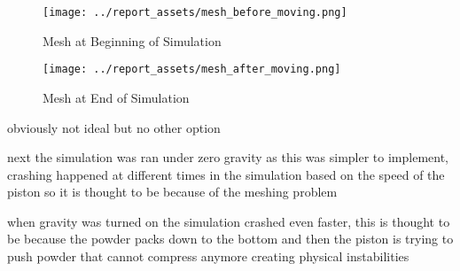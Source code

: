 \begin{figure}[htbp]
    \centering

    \begin{minipage}{0.45\textwidth}
        \centering
        \texttt{[image: ../report\_assets/mesh\_before\_moving.png]}
        \caption{Mesh at Beginning of Simulation}\label{fig:beginning-mesh}
    \end{minipage}
    \hfill
    \begin{minipage}{0.45\textwidth}
        \centering
        \texttt{[image: ../report\_assets/mesh\_after\_moving.png]}
        \caption{Mesh at End of Simulation}\label{fig:end-mesh}
    \end{minipage}

\end{figure}
obviously not ideal but no other option

next the simulation was ran under zero gravity as this was simpler to implement, crashing happened at different times in the simulation based on the speed of the piston so it is thought to be because of the meshing problem

when gravity was turned on the simulation crashed even faster, this is thought to be because the powder packs down to the bottom and then the piston is trying to push powder that cannot compress anymore creating physical instabilities

















